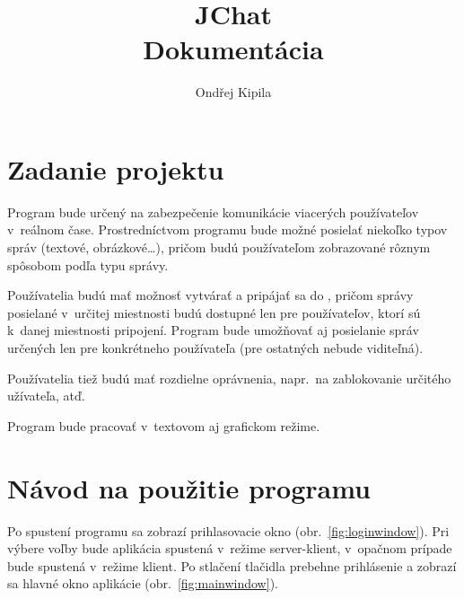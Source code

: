 \documentclass[11pt]{article}
\title{JChat \\ \large{Dokumentácia}}
\author{Ondřej Kipila}
\begin{document}
\maketitle

\pagebreak

\section{Zadanie projektu}
Program bude určený na zabezpečenie komunikácie viacerých používateľov v~reálnom čase.
Prostredníctvom programu bude možné posielať niekoľko typov správ (textové,
obrázkové\dots), pričom budú používateľom zobrazované rôznym spôsobom podľa typu
správy.

Používatelia budú mať možnosť vytvárať a pripájať sa do , pričom
správy posielané v~určitej miestnosti budú dostupné len pre používateľov, ktorí
sú k~danej miestnosti pripojení. Program bude umožňovať aj posielanie správ
určených len pre konkrétneho používateľa (pre ostatných nebude viditeľná).

Používatelia tiež budú mať rozdielne oprávnenia, napr.\ na zablokovanie určitého
užívateľa, atď.

Program bude pracovať v~textovom aj grafickom režime.

\pagebreak

\section{Návod na použitie programu}

Po spustení programu sa zobrazí prihlasovacie okno (obr.~\ref{fig:loginwindow}).
Pri výbere voľby  bude aplikácia spustená v~režime server-klient,
v~opačnom prípade bude spustená v~režime klient. Po stlačení tlačidla
 prebehne prihlásenie a zobrazí sa hlavné okno aplikácie
(obr.~\ref{fig:mainwindow}).

\bigskip
\end{document}
